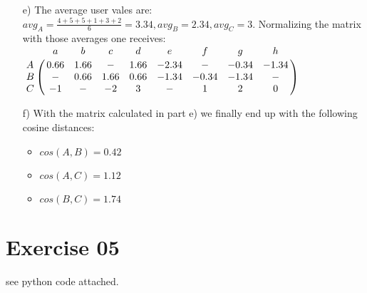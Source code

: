 \documentclass[11pt,a4paper]{scrartcl}
\begin{document}
\begin{itemize}
	\item[e)] The average user vales are: $avg_A = \frac{4+5+5+1+3+2}{6} = 3.34, avg_B = 2.34, avg_C = 3$. Normalizing the matrix with those averages one receives: \\
$\bordermatrix{
  & a	& b   & c & d & e & f & g & h  \cr
A & 0.66 & 1.66 & - & 1.66 & -2.34 & - & -0.34 & -1.34 \cr
B & - & 0.66 & 1.66 & 0.66 & -1.34 & -0.34 & -1.34 & - \cr
C & -1 & - & -2 & 3 & - & 1 & 2 & 0 \cr
}
$ 
	\item[f)] With the matrix calculated in part e) we finally end up with the following cosine distances:
	\begin{itemize}
		\item $cos(A,B) = 0.42 $
		\item $cos(A,C) = 1.12$
		\item $cos(B,C) = 1.74 $
	\end{itemize}
	\end{itemize}


\section*{Exercise 05}
see python code attached.
\end{document}
